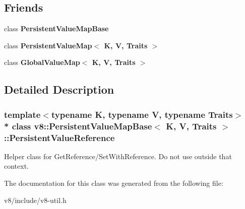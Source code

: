 \subsection*{Friends}
\begin{DoxyCompactItemize}
\item 
class {\bfseries Persistent\+Value\+Map\+Base}\hypertarget{classv8_1_1PersistentValueMapBase_1_1PersistentValueReference_ae5cccd63ef6d94c509ad8b6970d4017d}{}\label{classv8_1_1PersistentValueMapBase_1_1PersistentValueReference_ae5cccd63ef6d94c509ad8b6970d4017d}

\item 
class {\bfseries Persistent\+Value\+Map$<$ K, V, Traits $>$}\hypertarget{classv8_1_1PersistentValueMapBase_1_1PersistentValueReference_a22fcaa9f3ba179f3bb566eda5b93790d}{}\label{classv8_1_1PersistentValueMapBase_1_1PersistentValueReference_a22fcaa9f3ba179f3bb566eda5b93790d}

\item 
class {\bfseries Global\+Value\+Map$<$ K, V, Traits $>$}\hypertarget{classv8_1_1PersistentValueMapBase_1_1PersistentValueReference_a41811cde55d1ef227d1ba28778d95d08}{}\label{classv8_1_1PersistentValueMapBase_1_1PersistentValueReference_a41811cde55d1ef227d1ba28778d95d08}

\end{DoxyCompactItemize}


\subsection{Detailed Description}
\subsubsection*{template$<$typename K, typename V, typename Traits$>$\\*
class v8\+::\+Persistent\+Value\+Map\+Base$<$ K, V, Traits $>$\+::\+Persistent\+Value\+Reference}

Helper class for Get\+Reference/\+Set\+With\+Reference. Do not use outside that context. 

The documentation for this class was generated from the following file\+:\begin{DoxyCompactItemize}
\item 
v8/include/v8-\/util.\+h\end{DoxyCompactItemize}
